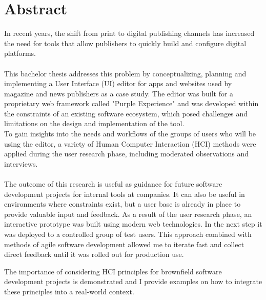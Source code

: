 %

\chapter*{Abstract}
In recent years, the shift from print to digital publishing channels has increased the need for tools that allow publishers to quickly build and configure digital platforms.
\\\\
This bachelor thesis addresses this problem by conceptualizing, planning and implementing a User Interface (UI) editor for apps and websites used by magazine and news publishers as a case study.
The editor was built for a proprietary web framework called "Purple Experience" and was developed within the constraints of an existing software ecosystem, which posed challenges and limitations on the design and implementation of the tool.
\\
To gain insights into the needs and workflows of the groups of users who will be using the editor, a variety of Human Computer Interaction (HCI) methods were applied during the user research phase, including moderated observations and interviews. 
\\\\
The outcome of this research is useful as guidance for future software development projects for internal tools at companies. It can also be useful in environments where constraints exist, but a user base is already in place to provide valuable input and feedback.
As a result of the user research phase, an interactive prototype was built using modern web technologies.
In the next step it was deployed to a controlled group of test users.
This approach combined with methods of agile software development allowed me to iterate fast and collect direct feedback until it was rolled out for production use.

The importance of considering HCI principles for brownfield software development projects is demonstrated and I provide examples on how to integrate these principles into a real-world context.